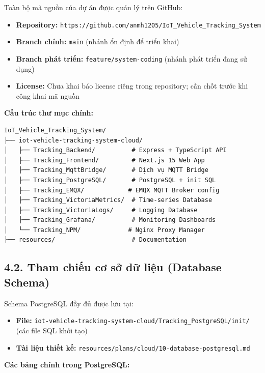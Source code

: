 \documentclass[13pt,a4paper]{extarticle}
\renewcommand{\\}{\thesislongtableorignewline\hline}%
\providecommand{\tightlist}{%
  \setlength{\itemsep}{0pt}\setlength{\parskip}{0pt}}
\begin{document}
Toàn bộ mã nguồn của dự án được quản lý trên GitHub:

\begin{itemize}
\tightlist
\item
  \textbf{Repository:}
  \texttt{https://github.com/anmh1205/IoT\_Vehicle\_Tracking\_System}
\item
  \textbf{Branch chính:} \texttt{main} (nhánh ổn định để triển khai)
\item
  \textbf{Branch phát triển:} \texttt{feature/system-coding} (nhánh phát
  triển đang sử dụng)
\item
  \textbf{License:} Chưa khai báo license riêng trong repository; cần
  chốt trước khi công khai mã nguồn
\end{itemize}

\textbf{Cấu trúc thư mục chính:}

\begin{verbatim}
IoT_Vehicle_Tracking_System/
├── iot-vehicle-tracking-system-cloud/
│   ├── Tracking_Backend/          # Express + TypeScript API
│   ├── Tracking_Frontend/         # Next.js 15 Web App
│   ├── Tracking_MqttBridge/       # Dịch vụ MQTT Bridge
│   ├── Tracking_PostgreSQL/       # PostgreSQL + init SQL
│   ├── Tracking_EMQX/            # EMQX MQTT Broker config
│   ├── Tracking_VictoriaMetrics/  # Time-series Database
│   ├── Tracking_VictoriaLogs/     # Logging Database
│   ├── Tracking_Grafana/          # Monitoring Dashboards
│   └── Tracking_NPM/             # Nginx Proxy Manager
├── resources/                     # Documentation

\end{verbatim}

\subsection{4.2. Tham chiếu cơ sở dữ liệu (Database
Schema)}\label{42-tham-chiux1ebfu-cux1a1-sux1edf-dux1eef-liux1ec7u-database-schema}

Schema PostgreSQL đầy đủ được lưu tại:

\begin{itemize}
\tightlist
\item
  \textbf{File:}
  \texttt{iot-vehicle-tracking-system-cloud/Tracking\_PostgreSQL/init/}
  (các file SQL khởi tạo)
\item
  \textbf{Tài liệu thiết kế:}
  \texttt{resources/plans/cloud/10-database-postgresql.md}
\end{itemize}

\textbf{Các bảng chính trong PostgreSQL:}
\end{document}

